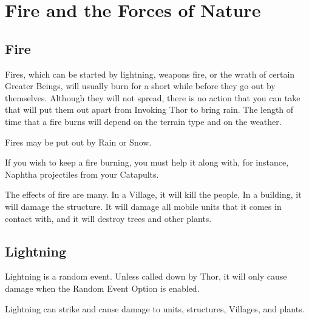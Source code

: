 
\chapter{Fire and the Forces of Nature}

\section{Fire}

Fires, which can be started by lightning, weapons fire, or the wrath of certain Greater Beings, will usually burn for a short while before they go out by themselves. Although they will not spread, there is no action that you can take that will put them out apart from Invoking Thor to bring rain. The length of time that a fire burns will depend on the terrain type and on the weather.

Fires may be put out by Rain or Snow.

If you wish to keep a fire burning, you must help it along with, for instance, Naphtha projectiles from your Catapults.

The effects of fire are many. In a Village, it will kill the people, In a building, it will damage the structure. It will damage all mobile units that it comes in contact with, and it will destroy trees and other plants.

\section{Lightning}

Lightning is a random event. Unless called down by Thor, it will only cause damage when the Random Event Option is enabled.

Lightning can strike and cause damage to units, structures, Villages, and plants.

